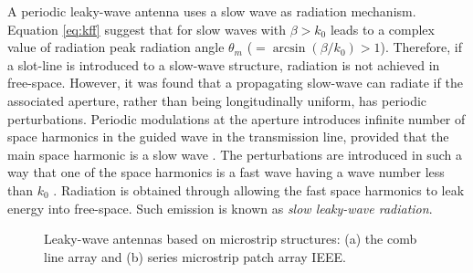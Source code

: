 A periodic leaky-wave antenna uses a slow wave as radiation mechanism. Equation \ref{eq:kff} suggest that for slow waves with $\beta>k_0$ leads to a complex value of radiation peak radiation angle  $\theta_m$ ($= \arcsin (\beta / k_0) > 1$). Therefore, if a slot-line is introduced to a slow-wave structure, radiation is not achieved in free-space. However, it was found that a propagating slow-wave can radiate if the associated aperture, rather than being longitudinally uniform, has periodic perturbations. Periodic modulations at the aperture introduces infinite number of space harmonics in the guided wave in the transmission line, provided that the main space harmonic is a slow wave \cite{Tamir1969}\cite{Hessel1969}. The perturbations are introduced in such a way that one of the space harmonics is a fast wave having a wave number less than $k_0$ \cite{Jackson2008}. Radiation is obtained through allowing the fast space harmonics to leak energy into free-space\cite{Sutinjo2008}. Such emission is known as \textit{slow leaky-wave radiation}.

\begin{figure} [t!]
\centering
\hspace*{\fill}%
	\mbox{}
\hspace*{\fill}%

\hspace*{\fill}%
  \mbox{}
	  \hspace*{\fill}%
  \caption[Leaky-wave antennas based on microstrip structures including the comb line array and a series microstrip patch array.]{Leaky-wave antennas based on microstrip structures: (a) the comb line array and (b) series microstrip patch array \cite{Sutinjo2008}  IEEE.}
\label{fig:microLWA}
\end{figure}


